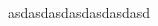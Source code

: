 \documentclass[10pt,a4paper]{article}
\begin{document}
\begin{multicols}{2}















	





 
\begin{thebibliography}{99} %

\bibitem{} {asdasdasdasdasdasdasd}

\end{thebibliography}


\end{multicols}
\end{document}
